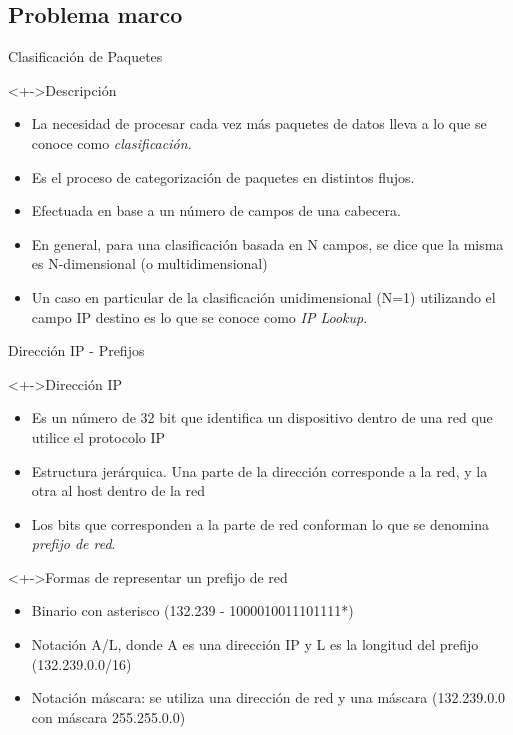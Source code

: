\documentclass[xcolor=dvipsnames]{beamer}
\begin{document}
\subsection{Problema marco}

\begin{frame}{Clasificación de Paquetes}

 \begin{block}<+->{Descripción}   
    \begin{itemize}
      \scriptsize
      \item La necesidad de procesar cada vez más paquetes de datos lleva a lo que se conoce como \textit{clasificación.}
      \item Es el proceso de categorización de paquetes en distintos flujos.
      \item Efectuada en base a un número de campos de una cabecera.
      \item En general, para una clasificación basada en N campos, se dice que la misma es N-dimensional (o multidimensional) 
      \item Un caso en particular de la clasificación unidimensional (N=1) utilizando el campo IP destino es lo que se conoce como \textit{IP Lookup}.     
    \end{itemize}
  \end{block}
\end{frame}

\begin{frame}{Dirección IP - Prefijos}
 \begin{block}<+->{Dirección IP}   
    \begin{itemize}
      \scriptsize
      \item Es un número de 32 bit que identifica un dispositivo dentro de una red que utilice el protocolo IP
      \item Estructura jerárquica. Una parte de la dirección corresponde a la red, y la otra al host dentro de la red
      \item Los bits que corresponden a la parte de red conforman lo que se denomina \textit{prefijo de red}.
     \end{itemize}
  \end{block}
\begin{block}<+->{Formas de representar un prefijo de red}   
    \begin{itemize}
      \scriptsize
      \item Binario con asterisco (132.239 - 1000010011101111*)
      \item Notación A/L, donde A es una dirección IP y L es la longitud del prefijo (132.239.0.0/16)
      \item Notación máscara: se utiliza una dirección de red y una máscara (132.239.0.0 con máscara 255.255.0.0)
     \end{itemize}
  \end{block}
\end{frame}
\end{document}
